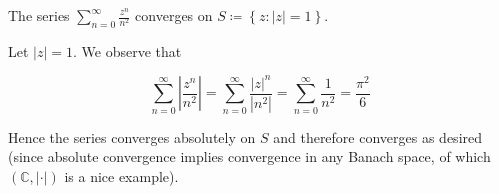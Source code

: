 The series $\sum\limits_{n=0}^{\infty}{\frac{z^n}{n^2}}$ converges on $S \coloneqq \left\{ z \colon |z| = 1 \right\}$.

\begin{solution}
    Let $|z| = 1$. We observe that

    $$
    \sum\limits_{n=0}^{\infty} \left| \frac{z^n}{n^2} \right| = \sum\limits_{n=0}^{\infty} \frac{|z|^n}{\left|n^2\right|} 
                                                              = \sum\limits_{n=0}^{\infty} \frac{1}{n^2} 
                                                              = \frac{\pi^2}{6}
    $$

    Hence the series converges absolutely on $S$ and therefore converges as desired (since absolute convergence implies
    convergence in any Banach space, of which $(\mathbb{C}, |\cdot|)$ is a nice example).
    \ \\
\end{solution}